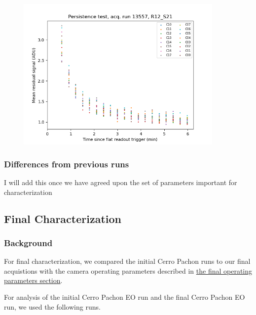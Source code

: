 \begin{figure}
\begin{centering}
\includegraphics[width=0.9\textwidth]{sections/figures/baselineCharacterization/persistence_plot_LSSTCam_R12_S21_u_lsstccs_eo_persistence_13557_w_2023_41_20231118T050437Z.png}
\end{centering}
\end{figure}

\subsubsection{Differences from previous
runs}\label{differences-from-previous-runs}

I will add this once we have agreed upon the set of parameters important
for characterization

\subsection{Final Characterization}\label{final-characterization}

\subsubsection{Background}\label{background-1}

For final characterization, we compared the initial Cerro Pachon runs to
our final acquistions with the camera operating parameters described in
\href{https://sitcomtn-148.lsst.io/v/main/index.html\#run-7-final-operating-parameters}{the
final operating parameters section}.

For analysis of the initial Cerro Pachon EO run and the final Cerro
Pachon EO run, we used the following runs.

